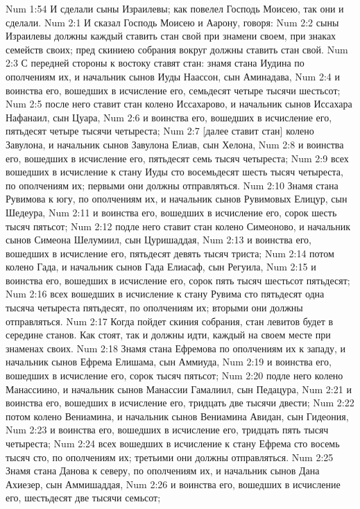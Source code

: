 Num 1:54  И сделали сыны Израилевы; как повелел Господь Моисею, так они и сделали.
Num 2:1  И сказал Господь Моисею и Аарону, говоря:
Num 2:2  сыны Израилевы должны каждый ставить стан свой при знамени своем, при знаках семейств своих; пред скиниею собрания вокруг должны ставить стан свой.
Num 2:3  С передней стороны к востоку ставят стан: знамя стана Иудина по ополчениям их, и начальник сынов Иуды Наассон, сын Аминадава,
Num 2:4  и воинства его, вошедших в исчисление его, семьдесят четыре тысячи шестьсот;
Num 2:5  после него ставит стан колено Иссахарово, и начальник сынов Иссахара Нафанаил, сын Цуара,
Num 2:6  и воинства его, вошедших в исчисление его, пятьдесят четыре тысячи четыреста;
Num 2:7  [далее ставит стан] колено Завулона, и начальник сынов Завулона Елиав, сын Хелона,
Num 2:8  и воинства его, вошедших в исчисление его, пятьдесят семь тысяч четыреста;
Num 2:9  всех вошедших в исчисление к стану Иуды сто восемьдесят шесть тысяч четыреста, по ополчениям их; первыми они должны отправляться.
Num 2:10  Знамя стана Рувимова к югу, по ополчениям их, и начальник сынов Рувимовых Елицур, сын Шедеура,
Num 2:11  и воинства его, вошедших в исчисление его, сорок шесть тысяч пятьсот;
Num 2:12  подле него ставит стан колено Симеоново, и начальник сынов Симеона Шелумиил, сын Цуришаддая,
Num 2:13  и воинства его, вошедших в исчисление его, пятьдесят девять тысяч триста;
Num 2:14  потом колено Гада, и начальник сынов Гада Елиасаф, сын Регуила,
Num 2:15  и воинства его, вошедших в исчисление его, сорок пять тысяч шестьсот пятьдесят;
Num 2:16  всех вошедших в исчисление к стану Рувима сто пятьдесят одна тысяча четыреста пятьдесят, по ополчениям их; вторыми они должны отправляться.
Num 2:17  Когда пойдет скиния собрания, стан левитов будет в середине станов. Как стоят, так и должны идти, каждый на своем месте при знаменах своих.
Num 2:18  Знамя стана Ефремова по ополчениям их к западу, и начальник сынов Ефрема Елишама, сын Аммиуда,
Num 2:19  и воинства его, вошедших в исчисление его, сорок тысяч пятьсот;
Num 2:20  подле него колено Манассиино, и начальник сынов Манассии Гамалиил, сын Педацура,
Num 2:21  и воинства его, вошедших в исчисление его, тридцать две тысячи двести;
Num 2:22  потом колено Вениамина, и начальник сынов Вениамина Авидан, сын Гидеония,
Num 2:23  и воинства его, вошедших в исчисление его, тридцать пять тысяч четыреста;
Num 2:24  всех вошедших в исчисление к стану Ефрема сто восемь тысяч сто, по ополчениям их; третьими они должны отправляться.
Num 2:25  Знамя стана Данова к северу, по ополчениям их, и начальник сынов Дана Ахиезер, сын Аммишаддая,
Num 2:26  и воинства его, вошедших в исчисление его, шестьдесят две тысячи семьсот;
